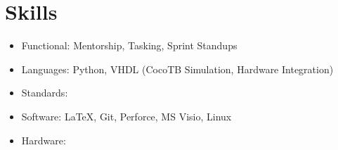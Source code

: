 \documentclass[10pt,final,sans]{resume}
\begin{document}
\section{Skills}
\begin{itemize}
  \item Functional: Mentorship, Tasking, Sprint Standups
  \item Languages: Python, VHDL (CocoTB Simulation, Hardware Integration)
  \item Standards: 
  \item Software: {\textrm \LaTeX}, Git, Perforce, MS Visio, Linux
  \item Hardware:
\end{itemize}


\end{document}
